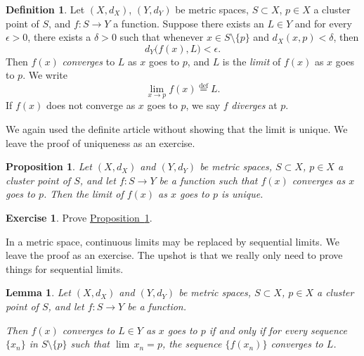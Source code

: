 \documentclass[12pt,openany]{book}
\theoremstyle{plain}
\newtheorem{lemma}[thm]{Lemma}
\newtheorem{prop}[thm]{Proposition}
\theoremstyle{remark}
\theoremstyle{definition}
\newtheorem{defn}[thm]{Definition}
\newenvironment{exbox}{%
    \def\FrameCommand{\vrule width 1pt \relax\hspace{10pt}}%
    \MakeFramed{\advance\hsize-\width\FrameRestore}%
}{%
    \endMakeFramed
}
\theoremstyle{exercise}
\newtheorem{exercise}{Exercise}[section]
\theoremstyle{example}
\newcommand{\propref}[1]{\hyperref[#1]{Proposition~\ref*{#1}}}
\begin{document}
\begin{defn}
%
Let $(X,d_X)$, $(Y,d_Y)$ be metric spaces, $S \subset X$, $p \in X$ a cluster point of $S$,
and $f \colon S \to Y$ a function.
Suppose there exists an $L \in Y$ and for every $\epsilon > 0$,
there exists a $\delta > 0$ such that whenever $x \in S \setminus \{ p \}$
and $d_X(x,p) < \delta$, then
\begin{equation*}
d_Y\bigl(f(x),L\bigr) < \epsilon .
\end{equation*}
Then $f(x)$
\emph{converges} to $L$ as $x$ goes
to $p$, and $L$ is the \emph{limit} of $f(x)$ as $x$
goes to $p$.  We write
%
\begin{equation*}
\lim_{x \to p} f(x) \overset{\text{def}}{=} L .
\end{equation*}
If $f(x)$ does not converge as $x$ goes to $p$, we say $f$
\emph{diverges} at $p$.
\end{defn}

We again used the definite article without showing that the
limit is unique.  We leave the proof of uniqueness as an exercise.

\begin{prop} \label{prop:mslimitisunique}
Let $(X,d_X)$ and $(Y,d_Y)$ be metric spaces, $S \subset X$, $p \in X$
a cluster point of $S$, and let $f \colon S \to Y$ be a function
such that $f(x)$ converges as $x$ goes to $p$.  Then
the limit of $f(x)$ as $x$ goes to $p$ is unique.
\end{prop}

\begin{exbox}
\begin{exercise}
Prove \propref{prop:mslimitisunique}.
\end{exercise}
\end{exbox}


In a metric space, continuous limits may be replaced by sequential limits.
We leave the proof as an exercise.
The upshot is that we really only need to prove things for sequential limits.

\begin{lemma}\label{ms:seqflimit:lemma}
Let $(X,d_X)$ and $(Y,d_Y)$ be metric spaces, $S \subset X$, $p \in X$
a cluster point of $S$, and let $f \colon S \to Y$ be a function.

Then
$f(x)$ converges to $L \in Y$ as $x$ goes to $p$ if and only if for every sequence $\{ x_n \}$
in $S \setminus \{p\}$
such that $\lim\, x_n = p$,
the sequence $\bigl\{ f(x_n) \bigr\}$ converges to $L$.
\end{lemma}
\end{document}
